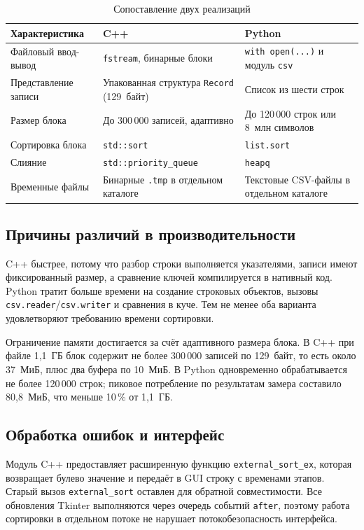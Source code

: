\documentclass[oneside,a4paper,14pt]{extarticle}
\begin{document}
\begin{table}[H]
	\centering
	\caption{Сопоставление двух реализаций}
	\renewcommand{\arraystretch}{1.2}
	\begin{tabular}{|p{3.6cm}|p{6.0cm}|p{6.2cm}|}
		\hline
		Характеристика & C++ & Python \\
		\hline
		Файловый ввод-вывод & \texttt{fstream}, бинарные блоки & \texttt{with open(...)} и модуль \texttt{csv} \\
		\hline
		Представление записи & Упакованная структура \texttt{Record} (129~байт) & Список из шести строк \\
		\hline
		Размер блока & До 300\,000 записей, адаптивно & До 120\,000 строк или 8~млн символов \\
		\hline
		Сортировка блока & \texttt{std::sort} & \texttt{list.sort} \\
		\hline
		Слияние & \texttt{std::priority\_queue} & \texttt{heapq} \\
		\hline
		Временные файлы & Бинарные \texttt{.tmp} в отдельном каталоге & Текстовые CSV-файлы в отдельном каталоге \\
		\hline
	\end{tabular}
\end{table}

\subsection*{Причины различий в производительности}
C++ быстрее, потому что разбор строки выполняется указателями, записи имеют фиксированный размер, а сравнение ключей компилируется в нативный код. Python тратит больше времени на создание строковых объектов, вызовы \texttt{csv.reader}/\texttt{csv.writer} и сравнения в куче. Тем не менее оба варианта удовлетворяют требованию времени сортировки.

Ограничение памяти достигается за счёт адаптивного размера блока. В C++ при файле 1,1~ГБ блок содержит не более 300\,000 записей по 129~байт, то есть около 37~МиБ, плюс два буфера по 10~МиБ. В Python одновременно обрабатывается не более 120\,000 строк; пиковое потребление по результатам замера составило 80,8~МиБ, что меньше 10\,\% от 1,1~ГБ.

\subsection*{Обработка ошибок и интерфейс}
Модуль C++ предоставляет расширенную функцию \texttt{external\_sort\_ex}, которая возвращает булево значение и передаёт в GUI строку с временами этапов. Старый вызов \texttt{external\_sort} оставлен для обратной совместимости. Все обновления Tkinter выполняются через очередь событий \texttt{after}, поэтому работа сортировки в отдельном потоке не нарушает потокобезопасность интерфейса.
\end{document}
